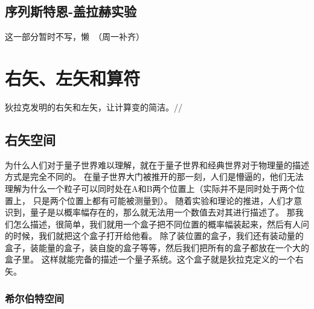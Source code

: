 \documentclass{book}
\begin{document}
\subsection{序列斯特恩-盖拉赫实验}
这一部分暂时不写，懒~（周一补齐）
\section{右矢、左矢和算符}
狄拉克发明的右矢和左矢，让计算变的简洁。//
\subsection{右矢空间}
为什么人们对于量子世界难以理解，就在于量子世界和经典世界对于物理量的描述方式是完全不同的。
在量子世界大门被推开的那一刻，人们是懵逼的，他们无法理解为什么一个粒子可以同时处在A和B两个位置上（实际并不是同时处于两个位置上，
只是两个位置上都有可能被测量到）。
随着实验和理论的推进，人们才意识到，量子是以概率幅存在的，那么就无法用一个数值去对其进行描述了。
那我们怎么描述，很简单，我们就用一个盒子把不同位置的概率幅装起来，然后有人问的时候，我们就把这个盒子打开给他看。
除了装位置的盒子，我们还有装动量的盒子，装能量的盒子，装自旋的盒子等等，然后我们把所有的盒子都放在一个大的盒子里。
这样就能完备的描述一个量子系统。这个盒子就是狄拉克定义的一个右矢。
\subsubsection{希尔伯特空间}
\end{document}
